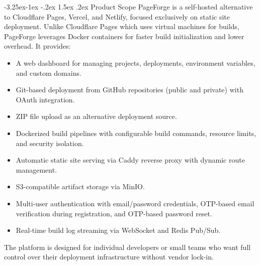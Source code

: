 \documentclass[12pt,a4paper]{article}
\makeatletter
\renewcommand\subsection{\@startsection{subsection}{2}{\z@}%
  {-3.25ex\@plus -1ex \@minus -.2ex}%
  {1.5ex \@plus .2ex}%
  {\needspace{2\baselineskip}\normalfont\large\bfseries}}
\makeatother
\begin{document}
\subsection{Product Scope}
PageForge is a self-hosted alternative to Cloudflare Pages, Vercel, and Netlify, focused exclusively on static site deployment. Unlike Cloudflare Pages which uses virtual machines for builds, PageForge leverages Docker containers for faster build initialization and lower overhead. It provides:
\begin{itemize}
    \item A web dashboard for managing projects, deployments, environment variables, and custom domains.
    \item Git-based deployment from GitHub repositories (public and private) with OAuth integration.
    \item ZIP file upload as an alternative deployment source.
    \item Dockerized build pipelines with configurable build commands, resource limits, and security isolation.
    \item Automatic static site serving via Caddy reverse proxy with dynamic route management.
    \item S3-compatible artifact storage via MinIO.
    \item Multi-user authentication with email/password credentials, OTP-based email verification during registration, and OTP-based password reset.
    \item Real-time build log streaming via WebSocket and Redis Pub/Sub.
\end{itemize}

The platform is designed for individual developers or small teams who want full control over their deployment infrastructure without vendor lock-in.
\end{document}
